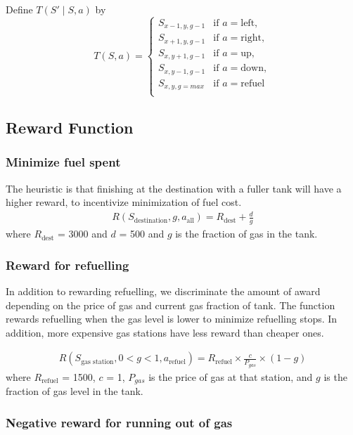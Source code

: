 \documentclass[10pt,twocolumn,letterpaper]{article}
\begin{document}
Define $T(S'\mid S, a) $  by
\[
T(S, a)=
\begin{cases}
S_{x-1,y,g-1} &\text{if } a = \text{left},\\
S_{x+1,y,g-1} &\text{if } a = \text{right},\\
S_{x,y+1,g-1} &\text{if } a = \text{up},\\
S_{x,y-1,g-1} &\text{if } a = \text{down},\\
S_{x,y,g=max} &\text{if } a = \text{refuel}\\
\end{cases}
\]

\subsection{Reward Function}
\subsubsection{Minimize fuel spent}

The heuristic is that finishing at the destination with a fuller tank will have a higher reward, to incentivize minimization of fuel cost.
\begin{gather*}
R(S_{\text{destination}}, g, a_{\text{all}}) = R_{\text{dest}} + \frac{d}{g}
\end{gather*}
where $R_{\text{dest}}$ = 3000 and $d$ = 500 and $g$ is the fraction of gas in the tank. 

\subsubsection{Reward for refuelling}
In addition to rewarding refuelling, we discriminate the amount of award depending on the price of gas and current gas fraction of tank. The function rewards refuelling when the gas level is lower to minimize refuelling stops. In addition, more expensive gas stations have less reward than cheaper ones.

\begin{gather*}
R(S_{\text{gas station}}, 0 < g < 1,  a_{\text{refuel}}) = R_{\text{refuel}} \times \frac{c}{P_{gas}} \times (1-g)
\end{gather*}where $R_{\text{refuel}}$ = 1500, $c$ = 1, $P_{gas}$ is the price of gas at that station, and $g$ is the fraction of gas level in the tank. 

\subsubsection{Negative reward for running out of gas}
\end{document}
